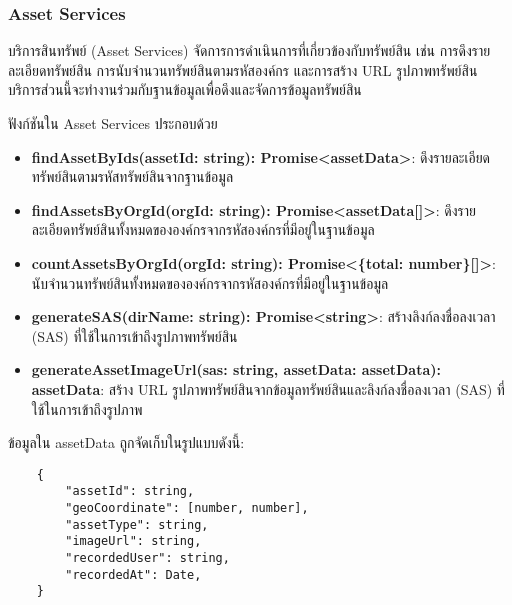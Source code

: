 \subsubsection{Asset Services}
\ifenglish
\else
บริการสินทรัพย์ (Asset Services) จัดการการดำเนินการที่เกี่ยวข้องกับทรัพย์สิน เช่น การดึงรายละเอียดทรัพย์สิน การนับจำนวนทรัพย์สินตามรหัสองค์กร และการสร้าง URL รูปภาพทรัพย์สิน บริการส่วนนี้จะทำงานร่วมกับฐานข้อมูลเพื่อดึงและจัดการข้อมูลทรัพย์สิน

ฟังก์ชันใน Asset Services ประกอบด้วย

\begin{itemize}
    \item \textbf{findAssetByIds(assetId: string): Promise<assetData>}: ดึงรายละเอียดทรัพย์สินตามรหัสทรัพย์สินจากฐานข้อมูล
    \item \textbf{findAssetsByOrgId(orgId: string): Promise<assetData[]>}: ดึงรายละเอียดทรัพย์สินทั้งหมดขององค์กรจากรหัสองค์กรที่มีอยู่ในฐานข้อมูล
    \item \textbf{countAssetsByOrgId(orgId: string): Promise<\{total: number\}[]>}: นับจำนวนทรัพย์สินทั้งหมดขององค์กรจากรหัสองค์กรที่มีอยู่ในฐานข้อมูล
    \item \textbf{generateSAS(dirName: string): Promise<string>}: สร้างลิงก์ลงชื่อลงเวลา (SAS) ที่ใช้ในการเข้าถึงรูปภาพทรัพย์สิน
    \item \textbf{generateAssetImageUrl(sas: string,
    assetData: assetData): assetData}: สร้าง URL รูปภาพทรัพย์สินจากข้อมูลทรัพย์สินและลิงก์ลงชื่อลงเวลา (SAS) ที่ใช้ในการเข้าถึงรูปภาพ
\end{itemize}

ข้อมูลใน assetData ถูกจัดเก็บในรูปแบบดังนี้:
\begin{lstlisting}
    {
        "assetId": string,
        "geoCoordinate": [number, number],
        "assetType": string,
        "imageUrl": string,
        "recordedUser": string,
        "recordedAt": Date,
    }
\end{lstlisting}
\fi